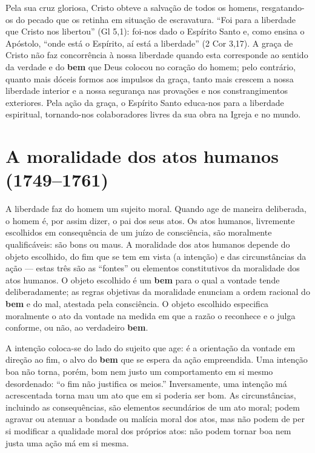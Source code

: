Pela sua cruz gloriosa, Cristo obteve a salvação de todos os homens, resgatando-os do pecado que os retinha em situação de escravatura. ``Foi para a liberdade que Cristo nos libertou'' (Gl 5,1): foi-nos dado o Espírito Santo e, como ensina o Apóstolo, ``onde está o Espírito, aí está a liberdade'' (2 Cor 3,17). A graça de Cristo não faz concorrência à nossa liberdade quando esta corresponde ao sentido da verdade e do \textbf{bem} que Deus colocou no coração do homem; pelo contrário, quanto mais dóceis formos aos impulsos da graça, tanto mais crescem a nossa liberdade interior e a nossa segurança nas provações e nos constrangimentos exteriores. Pela ação da graça, o Espírito Santo educa-nos para a liberdade espiritual, tornando-nos colaboradores livres da sua obra na Igreja e no mundo.

\section{A moralidade dos atos humanos (1749--1761)}

A liberdade faz do homem um sujeito moral. Quando age de maneira deliberada, o homem é, por assim dizer, o pai dos seus atos. Os atos humanos, livremente escolhidos em consequência de um juízo de consciência, são moralmente qualificáveis: são bons ou maus. A moralidade dos atos humanos depende do objeto escolhido, do fim que se tem em vista (a intenção) e das circunstâncias da ação --- estas três são as ``fontes'' ou elementos constitutivos da moralidade dos atos humanos. O objeto escolhido é um \textbf{bem} para o qual a vontade tende deliberadamente; as regras objetivas da moralidade enunciam a ordem racional do \textbf{bem} e do mal, atestada pela consciência. O objeto escolhido especifica moralmente o ato da vontade na medida em que a razão o reconhece e o julga conforme, ou não, ao verdadeiro \textbf{bem}.

A intenção coloca-se do lado do sujeito que age: é a orientação da vontade em direção ao fim, o alvo do \textbf{bem} que se espera da ação empreendida. Uma intenção boa não torna, porém, bom nem justo um comportamento em si mesmo desordenado: ``o fim não justifica os meios.'' Inversamente, uma intenção má acrescentada torna mau um ato que em si poderia ser bom. As circunstâncias, incluindo as consequências, são elementos secundários de um ato moral; podem agravar ou atenuar a bondade ou malícia moral dos atos, mas não podem de per si modificar a qualidade moral dos próprios atos: não podem tornar boa nem justa uma ação má em si mesma.

